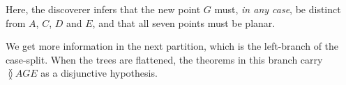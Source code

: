 \linebreak

Here, the discoverer infers that the new point $G$ must, \emph{in any case}, be distinct from $A$, $C$, $D$ and $E$, and that all seven points must be planar. 

We get more information in the next partition, which is the left-branch of the case-split. When the trees are flattened, the theorems in this branch carry $\between{A}{G}{E}$ as a disjunctive hypothesis.

